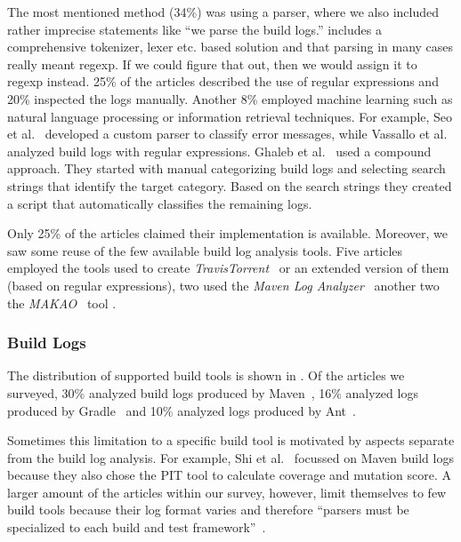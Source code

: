 The most mentioned method (34\%) was using a parser, where we also
included
rather imprecise statements like ``we parse the build logs.''
includes a comprehensive tokenizer, lexer etc.
based solution and that parsing in many cases really meant regexp.
If we could figure that out, then we would assign it to regexp instead.
25\% of the articles described the use of regular expressions and 20\%
inspected the logs manually.
Another 8\% employed machine learning such as natural language
processing or information retrieval techniques.
For example,
Seo et al.~\cite{seo2014programmers} developed a custom
parser to classify error messages, while Vassallo et
al.~\cite{vassallo2017a-tale} analyzed build logs with regular
expressions.
Ghaleb et al.~\cite{ghaleb2019studying} used a compound approach.
They started with manual categorizing build logs and selecting
search strings that identify the target category.
Based on the search strings they created a script that automatically
classifies the remaining logs.

Only 25\% of the articles claimed their implementation is available.
Moreover, we
saw some reuse of the few available build log analysis tools.
Five articles employed the tools used to create
\emph{TravisTorrent}~\cite{beller2017travistorrent,beller2017oops,
orellana2017differences,zhao2018comparing} or
an extended version of them~\cite{rott2019empirische,
shi2018evaluating} (based on regular expressions),
two used the
\emph{Maven Log Analyzer}~\cite{macho2018automatically,gallaba2018noise}
another two the
\emph{MAKAO}~\cite{wen2018blimp,adams2007design,adams2007makao} tool
.

\subsubsection{Build Logs}
The distribution of supported build tools is shown in
.
Of the articles we surveyed, 30\% analyzed build logs produced by
Maven~\cite{maven2019website}, 16\% analyzed logs produced by
Gradle~\cite{gradle2020website}
and 10\% analyzed logs produced by Ant~\cite{ant2020website}.

Sometimes this limitation to a specific build tool is motivated by
aspects separate from the build log analysis.
For example, Shi et al.~\cite{shi2018evaluating} focussed on Maven
build logs because they also chose the PIT tool to calculate coverage
and mutation score.
A larger amount of the articles within our survey, however, limit
themselves to few build tools because their log format varies and
therefore ``parsers must be specialized to each build and test
framework''~\cite{tomassi2019bugswarm}.

